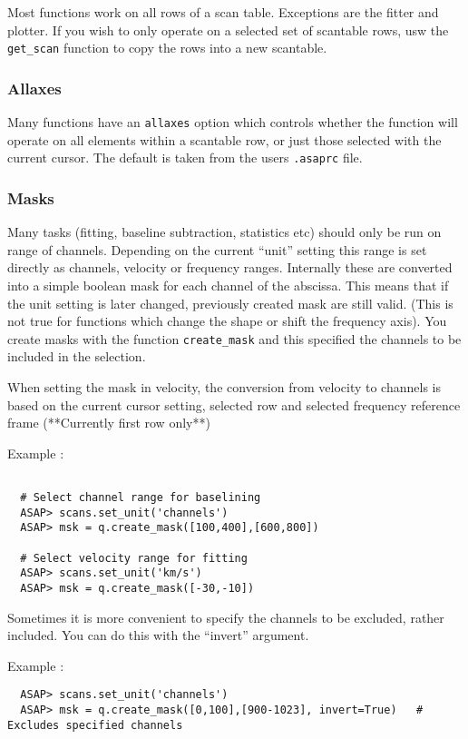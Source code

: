 \documentclass[11pt]{article}
\newcommand{\cmd}[1]{{\tt #1}}
\begin{document}
Most functions work on all rows of a scan table. Exceptions are the
fitter and plotter. If you wish to only operate on a selected set of
scantable rows, usw the \cmd{get_scan} function to copy the rows into
a new scantable.

\subsubsection{Allaxes}

Many functions have an \cmd{allaxes} option which controls whether the
function will operate on all elements within a scantable row, or just
those selected with the current cursor. The default is taken from the
users {\tt .asaprc} file.

\subsubsection{Masks}

Many tasks (fitting, baseline subtraction, statistics etc) should only
be run on range of channels. Depending on the current ``unit'' setting
this range is set directly as channels, velocity or frequency
ranges. Internally these are converted into a simple boolean mask for
each channel of the abscissa. This means that if the unit setting is
later changed, previously created mask are still valid. (This is not
true for functions which change the shape or shift the frequency axis).
You create masks with the function \cmd{create\_mask} and this specified
the channels to be included in the selection.

When setting the mask in velocity, the conversion from velocity
to channels is based on the current cursor setting, selected row and
selected frequency reference frame (**Currently first row only**)


Example :
\begin{verbatim}

  # Select channel range for baselining
  ASAP> scans.set_unit('channels')
  ASAP> msk = q.create_mask([100,400],[600,800])
 
  # Select velocity range for fitting
  ASAP> scans.set_unit('km/s')
  ASAP> msk = q.create_mask([-30,-10])
\end{verbatim}


Sometimes it is more convenient to specify the channels to be 
excluded, rather included.  You can do this with the ``invert'' argument.

Example :
\begin{verbatim}
  ASAP> scans.set_unit('channels')
  ASAP> msk = q.create_mask([0,100],[900-1023], invert=True)   # Excludes specified channels
\end{verbatim}
\end{document}
